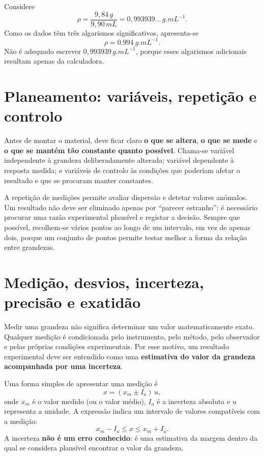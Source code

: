 \documentclass[11pt,a4paper,openany]{book}
\begin{document}
\begin{exemploresolvido}
Considere
\[
\rho=\frac{9,84\,\si{g}}{9,90\,\si{mL}}=0,993939\ldots\,\si{g.mL^{-1}}.
\]
Como os dados têm três algarismos significativos, apresenta-se
\[
\boxed{\rho=\SI{0.994}{g.mL^{-1}}}.
\]
Não é adequado escrever $0,993939\,\si{g.mL^{-1}}$, porque esses algarismos adicionais resultam apenas da calculadora.
\end{exemploresolvido}

\section{Planeamento: variáveis, repetição e controlo}
Antes de montar o material, deve ficar claro \textbf{o que se altera}, \textbf{o que se mede} e \textbf{o que se mantém tão constante quanto possível}. Chama-se variável independente à grandeza deliberadamente alterada; variável dependente à resposta medida; e variáveis de controlo às condições que poderiam afetar o resultado e que se procuram manter constantes.

A repetição de medições permite avaliar dispersão e detetar valores anómalos. Um resultado não deve ser eliminado apenas por ``parecer estranho'': é necessário procurar uma razão experimental plausível e registar a decisão. Sempre que possível, recolhem-se vários pontos ao longo de um intervalo, em vez de apenas dois, porque um conjunto de pontos permite testar melhor a forma da relação entre grandezas.


\section{Medição, desvios, incerteza, precisão e exatidão}

Medir uma grandeza não significa determinar um valor matematicamente exato. Qualquer medição é condicionada pelo instrumento, pelo método, pelo observador e pelas próprias condições experimentais. Por esse motivo, um resultado experimental deve ser entendido como uma \textbf{estimativa do valor da grandeza acompanhada por uma incerteza}.

\begin{essencial}
Uma forma simples de apresentar uma medição é
\[
x=(x_m\pm I_a)\,u,
\]
onde $x_m$ é o valor medido (ou o valor médio), $I_a$ é a incerteza absoluta e $u$ representa a unidade. A expressão indica um intervalo de valores compatíveis com a medição:
\[
x_m-I_a\leq x\leq x_m+I_a.
\]
A incerteza \textbf{não é um erro conhecido}: é uma estimativa da margem dentro da qual se considera plausível encontrar o valor da grandeza.
\end{essencial}
\end{document}
